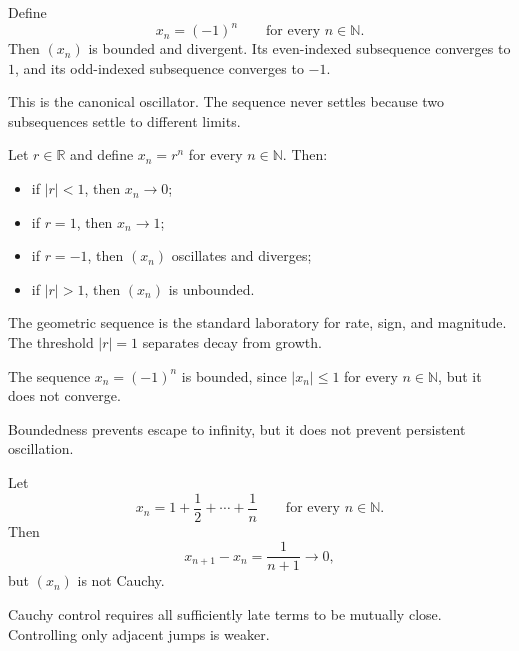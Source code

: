 \begin{example*}
\label{ex:sequence-example-oscillating}
Define
\[
  x_n=(-1)^n
  \qquad
  \text{for every } n\in\mathbb{N}.
\]
Then $(x_n)$ is bounded and divergent. Its even-indexed subsequence converges
to $1$, and its odd-indexed subsequence converges to $-1$.
\end{example*}

\begin{remark*}[Interpretation]
This is the canonical oscillator. The sequence never settles because two
subsequences settle to different limits.
\end{remark*}

\begin{example*}
\label{ex:sequence-example-geometric}
Let $r\in\mathbb{R}$ and define $x_n=r^n$ for every $n\in\mathbb{N}$.
Then:
\begin{itemize}
  \item if $|r|<1$, then $x_n\to 0$;
  \item if $r=1$, then $x_n\to 1$;
  \item if $r=-1$, then $(x_n)$ oscillates and diverges;
  \item if $|r|>1$, then $(x_n)$ is unbounded.
\end{itemize}
\end{example*}

\begin{remark*}[Interpretation]
The geometric sequence is the standard laboratory for rate, sign, and
magnitude. The threshold $|r|=1$ separates decay from growth.
\end{remark*}

\begin{example*}
\label{ex:sequence-counterexample-bounded-not-convergent}
The sequence $x_n=(-1)^n$ is bounded, since $|x_n|\le 1$ for every
$n\in\mathbb{N}$, but it does not converge.
\end{example*}

\begin{remark*}[Interpretation]
Boundedness prevents escape to infinity, but it does not prevent persistent
oscillation.
\end{remark*}

\begin{example*}
\label{ex:sequence-counterexample-successive-differences-not-cauchy}
Let
\[
  x_n=1+\frac{1}{2}+\cdots+\frac{1}{n}
  \qquad
  \text{for every } n\in\mathbb{N}.
\]
Then
\[
  x_{n+1}-x_n=\frac{1}{n+1}\to 0,
\]
but $(x_n)$ is not Cauchy.
\end{example*}

\begin{remark*}[Interpretation]
Cauchy control requires all sufficiently late terms to be mutually close.
Controlling only adjacent jumps is weaker.
\end{remark*}